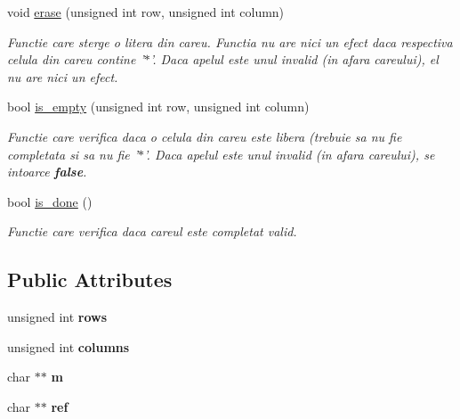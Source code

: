 \begin{DoxyCompactItemize}
void \hyperlink{classRebus_a671d4a4355f48a1dc31d82236cbd4935}{erase} (unsigned int row, unsigned int column)
\begin{DoxyCompactList}\small\item\em Functie care sterge o litera din careu. Functia nu are nici un efect daca respectiva celula din careu contine '$\ast$'. Daca apelul este unul invalid (in afara careului), el nu are nici un efect. \end{DoxyCompactList}\item 
bool \hyperlink{classRebus_ab91bb231fa7ee3fb81dee78829f6f249}{is\_\-empty} (unsigned int row, unsigned int column)
\begin{DoxyCompactList}\small\item\em Functie care verifica daca o celula din careu este libera (trebuie sa nu fie completata si sa nu fie '$\ast$'. Daca apelul este unul invalid (in afara careului), se intoarce {\bfseries false}. \end{DoxyCompactList}\item 
bool \hyperlink{classRebus_af5a546a1f074c8ed3dd744927b78a46a}{is\_\-done} ()
\begin{DoxyCompactList}\small\item\em Functie care verifica daca careul este completat valid. \end{DoxyCompactList}\end{DoxyCompactItemize}
\subsection*{Public Attributes}
\begin{DoxyCompactItemize}
\item 
\hypertarget{classRebus_a9365915f372e9f478fe5189c718f043f}{
unsigned int {\bfseries rows}}
\label{classRebus_a9365915f372e9f478fe5189c718f043f}

\item 
\hypertarget{classRebus_a68fdfd23dd2cd59b026e51cccd361469}{
unsigned int {\bfseries columns}}
\label{classRebus_a68fdfd23dd2cd59b026e51cccd361469}

\item 
\hypertarget{classRebus_a255a59b959732937887caafc0b8998f6}{
char $\ast$$\ast$ {\bfseries m}}
\label{classRebus_a255a59b959732937887caafc0b8998f6}

\item 
\hypertarget{classRebus_a6bd4ab40680f23f0da27dd05fa3cd420}{
char $\ast$$\ast$ {\bfseries ref}}
\label{classRebus_a6bd4ab40680f23f0da27dd05fa3cd420}

\end{DoxyCompactItemize}
